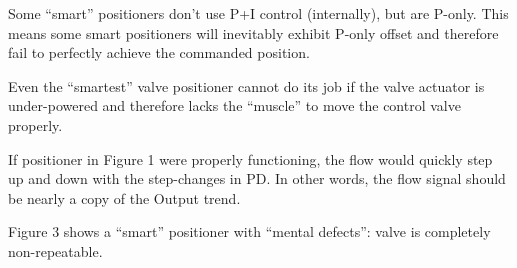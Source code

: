 
Some ``smart'' positioners don't use P+I control (internally), but are P-only.  This means some smart positioners will inevitably exhibit P-only offset and therefore fail to perfectly achieve the commanded position.

\vskip 10pt

Even the ``smartest'' valve positioner cannot do its job if the valve actuator is under-powered and therefore lacks the ``muscle'' to move the control valve properly.

\vskip 10pt

If positioner in Figure 1 were properly functioning, the flow would quickly step up and down with the step-changes in PD.  In other words, the flow signal should be nearly a copy of the Output trend.

\vskip 10pt

Figure 3 shows a ``smart'' positioner with ``mental defects'': valve is completely non-repeatable.













